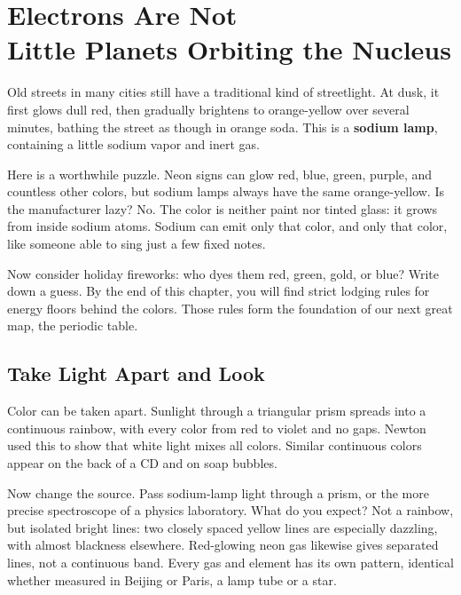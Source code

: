 \chapter[Electrons Are Not Little Planets Orbiting the Nucleus]{Electrons Are Not\protect\\ Little Planets Orbiting the Nucleus}

\begin{kaichang}
Old streets in many cities still have a traditional kind of streetlight. At dusk, it first glows dull red, then gradually brightens to orange-yellow over several minutes, bathing the street as though in orange soda. This is a \textbf{sodium lamp}, containing a little sodium vapor and inert gas.

Here is a worthwhile puzzle. Neon signs can glow red, blue, green, purple, and countless other colors, but sodium lamps always have the same orange-yellow. Is the manufacturer lazy? No. The color is neither paint nor tinted glass: it grows from inside sodium atoms. Sodium can emit only that color, and only that color, like someone able to sing just a few fixed notes.

Now consider holiday fireworks: who dyes them red, green, gold, or blue? Write down a guess. By the end of this chapter, you will find strict lodging rules for energy floors behind the colors. Those rules form the foundation of our next great map, the periodic table.
\end{kaichang}

\section{Take Light Apart and Look}

Color can be taken apart. Sunlight through a triangular prism spreads into a continuous rainbow, with every color from red to violet and no gaps. Newton used this to show that white light mixes all colors. Similar continuous colors appear on the back of a CD and on soap bubbles.

Now change the source. Pass sodium-lamp light through a prism, or the more precise spectroscope of a physics laboratory. What do you expect? Not a rainbow, but isolated bright lines: two closely spaced yellow lines are especially dazzling, with almost blackness elsewhere. Red-glowing neon gas likewise gives separated lines, not a continuous band. Every gas and element has its own pattern, identical whether measured in Beijing or Paris, a lamp tube or a star.

